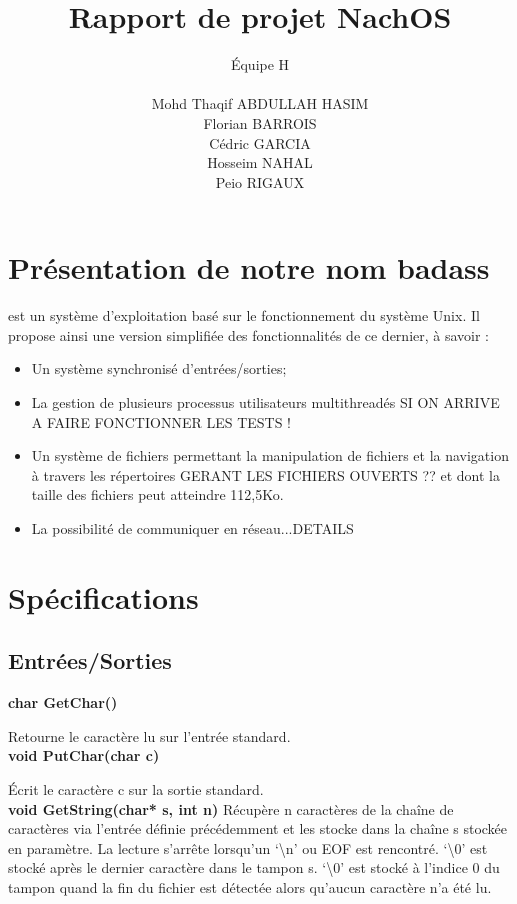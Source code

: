 \documentclass[12pt]{report}
\title{Rapport de projet NachOS}
\author{
\'Equipe H\\\\
Mohd Thaqif ABDULLAH HASIM\\
Florian BARROIS\\
Cédric GARCIA\\
Hosseim NAHAL\\
Peio RIGAUX\\
}
\begin{document}
\maketitle


\chapter{Présentation de \color{red}notre nom badass\color{black}}

est un système d'exploitation basé sur le fonctionnement du système Unix. Il propose ainsi une version simplifiée des fonctionnalités de ce dernier, à savoir :
\begin{itemize}%
\item Un système synchronisé d'entrées/sorties;
\item La gestion de plusieurs processus utilisateurs multithreadés \color{red}SI ON ARRIVE A FAIRE FONCTIONNER LES TESTS !\color{black}
\item Un système de fichiers permettant la manipulation de fichiers et la navigation à travers les répertoires \color{red}GERANT LES FICHIERS OUVERTS ??\color{black} et dont la taille des fichiers peut atteindre 112,5Ko.
\item La possibilité de communiquer en réseau...\color{red}DETAILS\color{black}

\end{itemize}


\chapter{Spécifications}
\section{Entrées/Sorties}

\textbf{char GetChar()}

Retourne le caractère lu sur l'entrée standard.\\


\textbf{void PutChar(char c)}

Écrit le caractère c sur la sortie standard.\\


\textbf{void GetString(char* s, int n)}
Récupère n caractères de la chaîne de caractères via l’entrée définie précédemment et les stocke dans la chaîne s stockée en paramètre. La lecture s’arrête lorsqu’un ‘\textbackslash n’ ou EOF est rencontré.
‘\textbackslash 0’ est stocké après le dernier caractère dans le tampon s.
‘\textbackslash 0’ est stocké à l’indice 0 du tampon quand la fin du fichier est détectée alors qu’aucun caractère n’a été lu.
\end{document}
